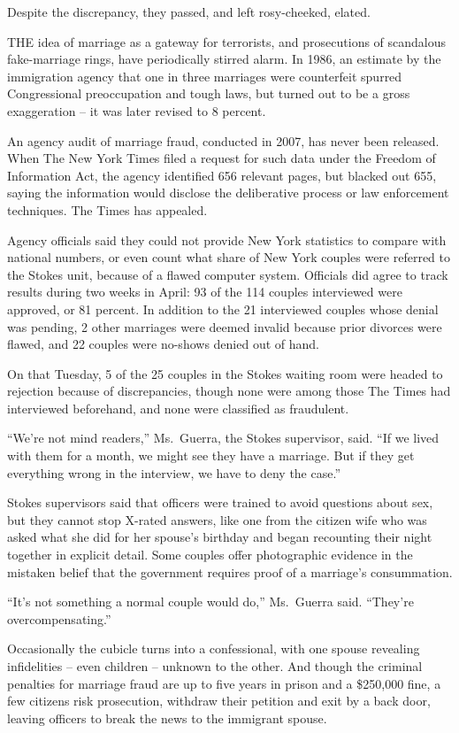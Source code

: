 ﻿\documentclass[12pt]{article}
\begin{document}
Despite the discrepancy, they passed, and left rosy-cheeked, elated.

THE idea of marriage as a gateway for terrorists, and prosecutions of scandalous fake-marriage
rings, have periodically stirred alarm. In 1986, an estimate by the immigration agency that one in
three marriages were counterfeit spurred Congressional preoccupation and tough laws, but turned out
to be a gross exaggeration -- it was later revised to 8 percent.

An agency audit of marriage fraud, conducted in 2007, has never been released. When The New York
Times filed a request for such data under the Freedom of Information Act, the agency identified 656
relevant pages, but blacked out 655, saying the information would disclose the deliberative process
or law enforcement techniques. The Times has appealed.

Agency officials said they could not provide New York statistics to compare with national numbers,
or even count what share of New York couples were referred to the Stokes unit, because of a flawed
computer system. Officials did agree to track results during two weeks in April: 93 of the 114
couples interviewed were approved, or 81 percent. In addition to the 21 interviewed couples whose
denial was pending, 2 other marriages were deemed invalid because prior divorces were flawed, and 22
couples were no-shows denied out of hand.

On that Tuesday, 5 of the 25 couples in the Stokes waiting room were headed to rejection because of
discrepancies, though none were among those The Times had interviewed beforehand, and none were
classified as fraudulent.

``We're not mind readers,'' Ms.~Guerra, the Stokes supervisor, said. ``If we lived with them for a
month, we might see they have a marriage. But if they get everything wrong in the interview, we have
to deny the case.''

Stokes supervisors said that officers were trained to avoid questions about sex, but they cannot
stop X-rated answers, like one from the citizen wife who was asked what she did for her spouse's
birthday and began recounting their night together in explicit detail. Some couples offer
photographic evidence in the mistaken belief that the government requires proof of a marriage's
consummation.

``It's not something a normal couple would do,'' Ms.~Guerra said. ``They're overcompensating.''

Occasionally the cubicle turns into a confessional, with one spouse revealing infidelities -- even
children -- unknown to the other. And though the criminal penalties for marriage fraud are up to
five years in prison and a \$250,000 fine, a few citizens risk prosecution, withdraw their petition
and exit by a back door, leaving officers to break the news to the immigrant spouse.
\end{document}
